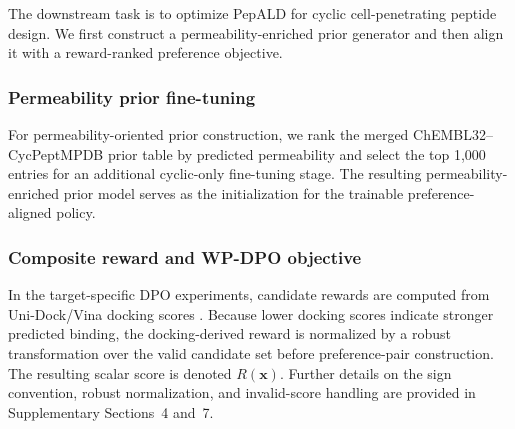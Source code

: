 \begin{methods}
The downstream task is to optimize PepALD for cyclic cell-penetrating peptide design.
We first construct a permeability-enriched prior generator and then align it with a reward-ranked preference objective.

\subsubsection{Permeability prior fine-tuning}\label{subsubsec:permeability_prior}

For permeability-oriented prior construction, we rank the merged ChEMBL32--CycPeptMPDB prior table by predicted permeability and select the top 1,000 entries for an additional cyclic-only fine-tuning stage.
The resulting permeability-enriched prior model serves as the initialization for the trainable preference-aligned policy.

\subsubsection{Composite reward and WP-DPO objective}\label{subsubsec:dpo_loss}

In the target-specific DPO experiments, candidate rewards are computed from Uni-Dock/Vina docking scores \citep{ref_unidock}.
Because lower docking scores indicate stronger predicted binding, the docking-derived reward is normalized by a robust transformation over the valid candidate set before preference-pair construction.
The resulting scalar score is denoted $R(\mathbf{x})$.
Further details on the sign convention, robust normalization, and invalid-score handling are provided in Supplementary Sections~4 and~7.


\end{methods}
